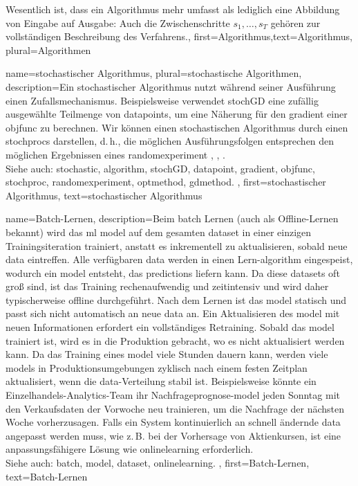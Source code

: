 {{{{{		Wesentlich ist, dass ein Algorithmus mehr umfasst als lediglich eine Abbildung von Eingabe 
		auf Ausgabe: Auch die Zwischenschritte $s_1,\ldots,s_T$ gehören zur vollständigen Beschreibung des Verfahrens.},
	first={Algorithmus},text={Algorithmus}, plural={Algorithmen}
}

{name={stochastischer Algorithmus}, 
 plural={stochastische Algorithmen},
	description={Ein \gls{stochastischer} \gls{Algorithmus} nutzt während seiner Ausführung einen Zufallsmechanismus. 
		Beispielsweise verwendet \gls{stochGD} eine zufällig ausgewählte Teilmenge von \glspl{datapoint}, 
		um eine Näherung für den \gls{gradient} einer \gls{objfunc} zu berechnen. 
		Wir können einen \gls{stochastischen} \gls{Algorithmus} durch einen \glspl{stochproc} darstellen, 
		d. h., die möglichen Ausführungsfolgen entsprechen den möglichen Ergebnissen eines 
		\gls{randomexperiment} \cite{BertsekasProb}, \cite{RandomizedAlgos}, \cite{Gallager13}.		
		\\ 
		Siehe auch: \gls{stochastic}, \gls{algorithm}, \gls{stochGD}, \gls{datapoint}, \gls{gradient}, \gls{objfunc}, \gls{stochproc}, 
		\gls{randomexperiment}, \gls{optmethod}, \gls{gdmethod}. },
	first={stochastischer Algorithmus},
	text={stochastischer Algorithmus} 
}

{name={Batch-Lernen},
	description={Beim \gls{batch} Lernen (auch als Offline-Lernen bekannt) wird das \gls{ml} \gls{model} 
		auf dem gesamten \gls{dataset} in einer einzigen Trainingsiteration trainiert, anstatt es inkrementell zu aktualisieren, sobald neue \gls{data} eintreffen. 
		Alle verfügbaren \gls{data} werden in einen Lern-\gls{algorithm} eingespeist, wodurch ein \gls{model} entsteht, das \glspl{prediction} liefern kann. 
		Da diese \glspl{dataset} oft groß sind, ist das Training rechenaufwendig und zeitintensiv und wird daher typischerweise offline durchgeführt. 
		Nach dem Lernen ist das \gls{model} statisch und passt sich nicht automatisch an neue \gls{data} an. 
		Ein Aktualisieren des \gls{model} mit neuen Informationen erfordert ein vollständiges Retraining. 
		Sobald das \gls{model} trainiert ist, wird es in die Produktion gebracht, wo es nicht aktualisiert werden kann. 
		Da das Training eines \gls{model} viele Stunden dauern kann, werden viele \glspl{model} in Produktionsumgebungen zyklisch nach einem festen Zeitplan aktualisiert, 
		wenn die \gls{data}-Verteilung stabil ist. Beispielsweise könnte ein Einzelhandels-Analytics-Team ihr Nachfrageprognose-\gls{model} jeden Sonntag 
		mit den Verkaufsdaten der Vorwoche neu trainieren, um die Nachfrage der nächsten Woche vorherzusagen. 
		Falls ein System kontinuierlich an schnell ändernde \gls{data} angepasst werden muss, wie z. B. bei der Vorhersage von Aktienkursen, 
		ist eine anpassungsfähigere Lösung wie \gls{onlinelearning} erforderlich.
		\\
		Siehe auch: \gls{batch}, \gls{model}, \gls{dataset}, \gls{onlinelearning}. },
	first={Batch-Lernen}, 
	text={Batch-Lernen}
}

}}}
